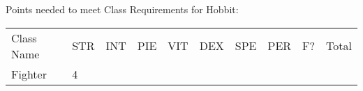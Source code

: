 \documentclass[12pt]{article}
\begin{document}
Points needed to meet Class Requirements for Hobbit:

\begin{longtable}[]{@{}llllllllll@{}}
\toprule
\begin{minipage}[t]{0.13\columnwidth}\raggedright\strut
Class Name
\strut\end{minipage} &
\begin{minipage}[t]{0.06\columnwidth}\raggedright\strut
STR
\strut\end{minipage} &
\begin{minipage}[t]{0.06\columnwidth}\raggedright\strut
INT
\strut\end{minipage} &
\begin{minipage}[t]{0.06\columnwidth}\raggedright\strut
PIE
\strut\end{minipage} &
\begin{minipage}[t]{0.06\columnwidth}\raggedright\strut
VIT
\strut\end{minipage} &
\begin{minipage}[t]{0.06\columnwidth}\raggedright\strut
DEX
\strut\end{minipage} &
\begin{minipage}[t]{0.06\columnwidth}\raggedright\strut
SPE
\strut\end{minipage} &
\begin{minipage}[t]{0.06\columnwidth}\raggedright\strut
PER
\strut\end{minipage} &
\begin{minipage}[t]{0.07\columnwidth}\raggedright\strut
F?
\strut\end{minipage} &
\begin{minipage}[t]{0.08\columnwidth}\raggedright\strut
Total
\strut\end{minipage}\tabularnewline
\begin{minipage}[t]{0.13\columnwidth}\raggedright\strut
Fighter
\strut\end{minipage} &
\begin{minipage}[t]{0.06\columnwidth}\raggedright\strut
4
\strut\end{minipage} &
\begin{minipage}[t]{0.06\columnwidth}\raggedright\strut
\strut\end{minipage} &
\begin{minipage}[t]{0.06\columnwidth}\raggedright\strut
\strut\end{minipage} &
\begin{minipage}[t]{0.06\columnwidth}\raggedright\strut
\strut\end{minipage} &

\end{longtable}
\end{document}
